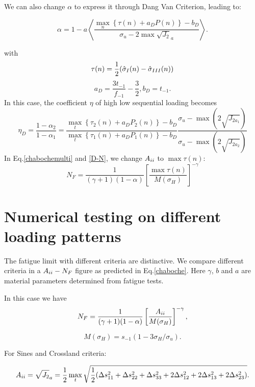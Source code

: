 We can also change $\alpha$ to express it through Dang Van Criterion, leading to:

\begin{equation}\alpha = 1 - a\left\langle \frac{\max\limits_{n}\left\{\tau{(n)}+a_DP{(n)}\right\}-b_D}{ \sigma_{u} - 2\max\sqrt{J_2}_a}\right\rangle.\end{equation}

with
\begin{equation}
\tau(n)=\frac{1}{2}(\hat{\sigma}_{\Rmnum{1}}(n)-\hat{\sigma}_{\Rmnum{3}}(n))
\end{equation}
$$a_D=\frac{3t_{-1}}{f_{-1}}-\frac{3}{2}, b_D=t_{-1}.$$
In this case, the coefficient $\eta$ of high low sequential loading becomes
\begin{equation}\eta_D=\frac{1-\alpha_2}{1-\alpha_1}=
\frac{\max\limits_{t}\left\{\tau_2{(n)}+a_DP_2{(n)}\right\}-b_D}{\max\limits_{t}\left\{\tau_1{(n)}+a_DP_1{(n)}\right\}-b_D}\frac{ \sigma_{u} - \max(2\sqrt{J_{2a_1}})}{  \sigma_{u} - \max(2\sqrt{J_{2a_2}})}
\end{equation}
In Eq.\eqref{chabochemulti} and \eqref{D-N}, we change $A_{\uppercase\expandafter{\romannumeral2}}$ to $\max\tau(n)$:
\begin{equation}N_F = \frac{1}{(\gamma+1)(1-\alpha)}\left[\frac{\max\tau(n)}{M(\sigma_H)}\right]^{-\gamma}
\label{dvchaboche}
\end{equation} 

\section{Numerical testing on different loading patterns}
The fatigue limit with different criteria are distinctive. We compare different criteria in a $A_{\uppercase\expandafter{\romannumeral2}}-N_F$ figure as predicted in Eq.\eqref{chaboche}. Here
$\gamma$, $b$ and $a$ are material parameters determined from fatigue tests.

In this case we have 
$$N_F = \frac{1}{(\gamma+1)(1-\alpha)}\left[\frac{A_{\uppercase\expandafter{\romannumeral2}}}{M(\sigma_H)}\right]^{-\gamma},$$

$$M(\sigma_H)=s_{-1}\left(1-3\sigma_H/\sigma_u\right).$$

For Sines and Crossland criteria:

$$A_{\uppercase\expandafter{\romannumeral2}}=\sqrt{J_2}_a=\frac{1}{2}\max\limits_{t}\sqrt{\frac{1}{2}(\Delta s_{11}^2+\Delta s_{22}^2+\Delta s_{33}^2+2\Delta s_{12}^2+2\Delta s_{13}^2+2\Delta s_{23}^2)}.$$

